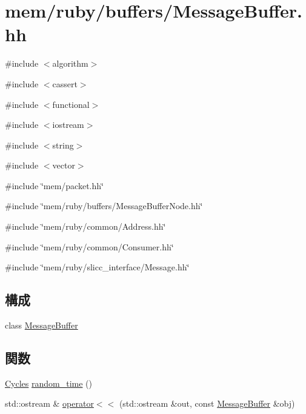 \hypertarget{MessageBuffer_8hh}{
\section{mem/ruby/buffers/MessageBuffer.hh}
\label{MessageBuffer_8hh}
}
{\ttfamily \#include $<$algorithm$>$}\par
{\ttfamily \#include $<$cassert$>$}\par
{\ttfamily \#include $<$functional$>$}\par
{\ttfamily \#include $<$iostream$>$}\par
{\ttfamily \#include $<$string$>$}\par
{\ttfamily \#include $<$vector$>$}\par
{\ttfamily \#include \char`\"{}mem/packet.hh\char`\"{}}\par
{\ttfamily \#include \char`\"{}mem/ruby/buffers/MessageBufferNode.hh\char`\"{}}\par
{\ttfamily \#include \char`\"{}mem/ruby/common/Address.hh\char`\"{}}\par
{\ttfamily \#include \char`\"{}mem/ruby/common/Consumer.hh\char`\"{}}\par
{\ttfamily \#include \char`\"{}mem/ruby/slicc\_\-interface/Message.hh\char`\"{}}\par
\subsection*{構成}
\begin{DoxyCompactItemize}
\item 
class \hyperlink{classMessageBuffer}{MessageBuffer}
\end{DoxyCompactItemize}
\subsection*{関数}
\begin{DoxyCompactItemize}
\item 
\hyperlink{classCycles}{Cycles} \hyperlink{MessageBuffer_8hh_a90ad9a05733c8b95a6f383ef561bd0d5}{random\_\-time} ()
\item 
std::ostream \& \hyperlink{MessageBuffer_8hh_a5434526dc83528c47b8c526f981f7c3f}{operator$<$$<$} (std::ostream \&out, const \hyperlink{classMessageBuffer}{MessageBuffer} \&obj)
\end{DoxyCompactItemize}


